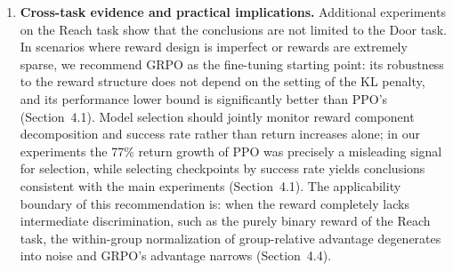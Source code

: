 \begin{enumerate}
  \item \textbf{Cross-task evidence and practical implications.} Additional experiments on the Reach task show that the conclusions are not limited to the Door task. In scenarios where reward design is imperfect or rewards are extremely sparse, we recommend GRPO as the fine-tuning starting point: its robustness to the reward structure does not depend on the setting of the KL penalty, and its performance lower bound is significantly better than PPO's (Section~4.1). Model selection should jointly monitor reward component decomposition and success rate rather than return increases alone; in our experiments the 77\% return growth of PPO was precisely a misleading signal for selection, while selecting checkpoints by success rate yields conclusions consistent with the main experiments (Section~4.1). The applicability boundary of this recommendation is: when the reward completely lacks intermediate discrimination, such as the purely binary reward of the Reach task, the within-group normalization of group-relative advantage degenerates into noise and GRPO's advantage narrows (Section~4.4).
\end{enumerate}
